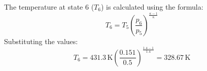 The temperature at state 6 (\( T_6 \)) is calculated using the formula:  
\[
T_6 = T_5 \left( \frac{p_6}{p_5} \right)^{\frac{\kappa - 1}{\kappa}}
\]  
Substituting the values:  
\[
T_6 = 431.3 \, \text{K} \left( \frac{0.151}{0.5} \right)^{\frac{1.4 - 1}{1.4}} = 328.67 \, \text{K}
\]